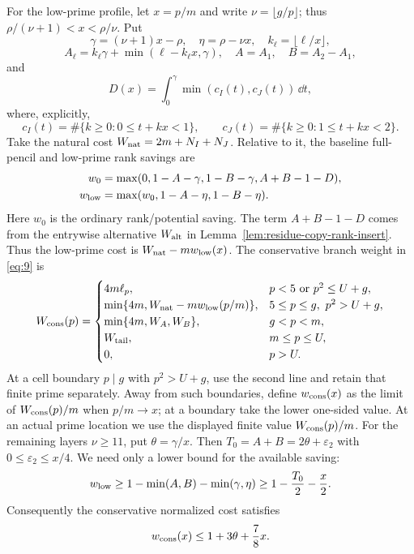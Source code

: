 For the low-prime profile, let $x=p/m$ and write
$\nu=\lfloor g/p\rfloor$; thus
$\rho/(\nu+1)<x<\rho/\nu$. Put
\[
 \gamma=(\nu+1)x-\rho,\quad\eta=\rho-\nu x,\quad
 k_\ell=\lfloor\ell/x\rfloor,
\]
\[
 A_\ell=k_\ell\gamma+\min(\ell-k_\ell x,\gamma),\quad
 A=A_1,\quad B=A_2-A_1,
\]
and
\[
 D(x)=\int_0^\gamma\min(c_I(t),c_J(t))\,\dd t,
\]
where, explicitly,
\[
 c_I(t)=\#\{k\ge0:0\le t+kx<1\},\qquad
 c_J(t)=\#\{k\ge0:1\le t+kx<2\}.
\]
Take the natural cost $W_{\rm nat}=2m+N_I+N_J$. Relative to it, the
baseline full-pencil and low-prime rank savings are
\begin{equation}
\begin{aligned}
 w_0&=\max(0,1-A-\gamma,1-B-\gamma,A+B-1-D),\\
 w_{\rm low}&=\max(w_0,1-A-\eta,1-B-\eta).
\end{aligned}                                               \label{eq:7}
\end{equation}
Here $w_0$ is the ordinary rank/potential saving. The term $A+B-1-D$
comes from the entrywise alternative $W_{\rm alt}$ in
Lemma~\ref{lem:residue-copy-rank-insert}. Thus the low-prime cost is
$W_{\rm nat}-mw_{\rm low}(x)$. The conservative branch weight in
\eqref{eq:9} is
\begin{equation}
W_{\rm cons}(p)=
\begin{cases}
4m\ell_p,&p<5\ \text{or}\ p^2\le U+g,\\
\min\{4m,W_{\rm nat}-mw_{\rm low}(p/m)\},
   &5\le p\le g,\ p^2>U+g,\\
\min\{4m,W_A,W_B\},&g<p<m,\\
W_{\rm tail},&m\le p\le U,\\
0,&p>U.
\end{cases}                                                   \label{eq:W-cons-piecewise}
\end{equation}
At a cell boundary $p\mid g$ with $p^2>U+g$, use the second line and
retain that finite prime separately. Away from such boundaries, define
$w_{\rm cons}(x)$ as the limit of $W_{\rm cons}(p)/m$ when $p/m\to x$;
at a boundary take the lower one-sided value. At an actual prime location
we use the displayed finite value $W_{\rm cons}(p)/m$. For the remaining layers $\nu\ge11$, put
$\theta=\gamma/x$. Then
$T_0=A+B=2\theta+\varepsilon_2$ with $0\le\varepsilon_2\le x/4$.
We need only a lower bound for the available saving:
\[
 w_{\rm low}\ge1-\min(A,B)-\min(\gamma,\eta)
       \ge1-\frac {T_0}2-\frac x2.
\]
Consequently the conservative normalized cost satisfies
\begin{equation}
 w_{\rm cons}(x)\le1+3\theta+\frac78x.                    \label{eq:8}
\end{equation}

